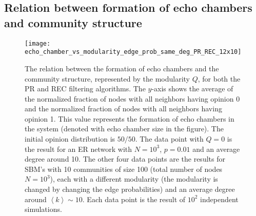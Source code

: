 \documentclass[11 pt , letterpaper , twoside , openright]{book}
\begin{document}


\subsection{Relation between formation of echo chambers and community structure}\label{echoVSmod}

\begin{figure}[H]
	\texttt{[image: echo\_chamber\_vs\_modularity\_edge\_prob\_same\_deg\_PR\_REC\_12x10]}
	\captionsetup{format=plain}
	\caption[Relation between the formation of echo chambers and community structure (modularity).]{The relation between the formation of echo chambers and the community structure, represented by the modularity $Q$, for both the PR and REC filtering algorithms. The $y$-axis shows the average of the normalized fraction of nodes with all neighbors having opinion 0 and the normalized fraction of nodes with all neighbors having opinion 1. This value represents the formation of echo chambers in the system (denoted with echo chamber size in the figure). The initial opinion distribution is $50/50$. The data point with $Q = 0$ is the result for an ER network with $N = 10^3$, $p = 0.01$ and an average degree around 10. The other four data points are the results for SBM's with 10 communities of size 100 (total number of nodes $N = 10^3$), each with a different modularity (the modularity is changed by changing the edge probabilities) and an average degree around $\left<k\right> \sim 10$. Each data point is the result of $10^2$ independent simulations.}
\label{echo_vs_mod}
\end{figure}
\end{document}
